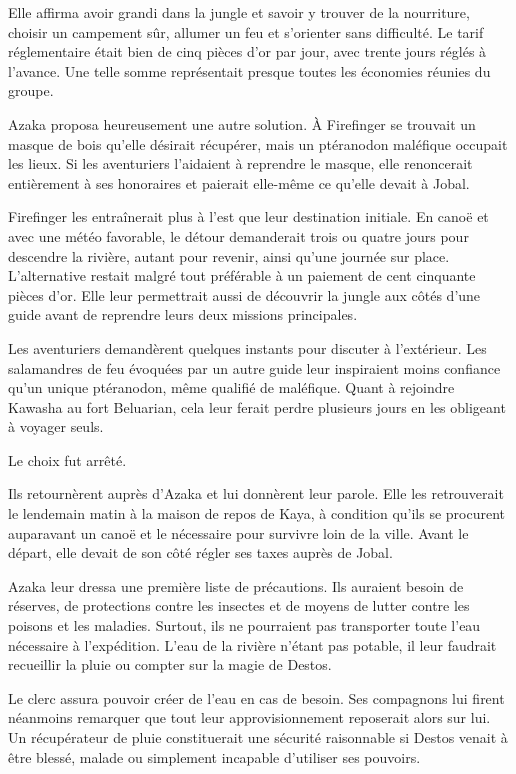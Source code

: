 Elle affirma avoir grandi dans la jungle et savoir y trouver de la nourriture, choisir un campement sûr, allumer un feu et s'orienter sans difficulté. Le tarif réglementaire était bien de cinq pièces d'or par jour, avec trente jours réglés à l'avance. Une telle somme représentait presque toutes les économies réunies du groupe.

Azaka proposa heureusement une autre solution. À Firefinger se trouvait un masque de bois qu'elle désirait récupérer, mais un ptéranodon maléfique occupait les lieux. Si les aventuriers l'aidaient à reprendre le masque, elle renoncerait entièrement à ses honoraires et paierait elle-même ce qu'elle devait à Jobal.

Firefinger les entraînerait plus à l'est que leur destination initiale. En canoë et avec une météo favorable, le détour demanderait trois ou quatre jours pour descendre la rivière, autant pour revenir, ainsi qu'une journée sur place. L'alternative restait malgré tout préférable à un paiement de cent cinquante pièces d'or. Elle leur permettrait aussi de découvrir la jungle aux côtés d'une guide avant de reprendre leurs deux missions principales.

Les aventuriers demandèrent quelques instants pour discuter à l'extérieur. Les salamandres de feu évoquées par un autre guide leur inspiraient moins confiance qu'un unique ptéranodon, même qualifié de maléfique. Quant à rejoindre Kawasha au fort Beluarian, cela leur ferait perdre plusieurs jours en les obligeant à voyager seuls.

Le choix fut arrêté.

Ils retournèrent auprès d'Azaka et lui donnèrent leur parole. Elle les retrouverait le lendemain matin à la maison de repos de Kaya, à condition qu'ils se procurent auparavant un canoë et le nécessaire pour survivre loin de la ville. Avant le départ, elle devait de son côté régler ses taxes auprès de Jobal.

\scenebreak

Azaka leur dressa une première liste de précautions. Ils auraient besoin de réserves, de protections contre les insectes et de moyens de lutter contre les poisons et les maladies. Surtout, ils ne pourraient pas transporter toute l'eau nécessaire à l'expédition. L'eau de la rivière n'étant pas potable, il leur faudrait recueillir la pluie ou compter sur la magie de Destos.

Le clerc assura pouvoir créer de l'eau en cas de besoin. Ses compagnons lui firent néanmoins remarquer que tout leur approvisionnement reposerait alors sur lui. Un récupérateur de pluie constituerait une sécurité raisonnable si Destos venait à être blessé, malade ou simplement incapable d'utiliser ses pouvoirs.


